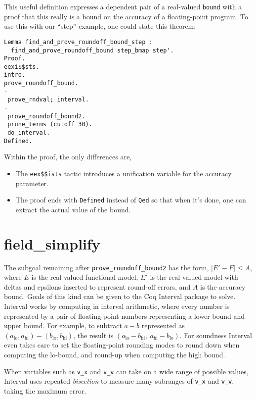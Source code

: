 \documentclass[article]{memoir}
\begin{document}
This useful definition expresses a dependent pair of a real-valued
\lstinline{bound} with a proof that this really is a bound
on the accuracy of a floating-point program.  To use this with
our ``step'' example, one could state this theorem:

\begin{lstlisting}
Lemma find_and_prove_roundoff_bound_step :
  find_and_prove_roundoff_bound step_bmap step'.
Proof.
eexi$$sts.
intro.
prove_roundoff_bound.
-
 prove_rndval; interval.
-
 prove_roundoff_bound2.
 prune_terms (cutoff 30).
 do_interval.
Defined.
\end{lstlisting}

Within the proof, the only differences are,
\begin{itemize}
\item  The \lstinline{eex$$ists} tactic introduces a unification variable
  for the accuracy parameter.
\item The proof ends with \lstinline{Defined} instead of \lstinline{Qed}
  so that when it's done, one can extract the actual value of the bound.
\end{itemize}

\chapter{field\_simplify}

The subgoal remaining after \lstinline{prove_roundoff_bound2} has the
form, $|E'-E|\le A$, where $E$ is the real-valued functional model,
$E'$ is the real-valued model with deltas and epsilons inserted to
represent round-off errors, and $A$ is the accuracy bound.
Goals of this kind can be given to the Coq Interval package to solve.
Interval works by computing in interval arithmetic,
where every number is represented by a pair of floating-point numbers
representing a lower bound and upper bound.  For example, to subtract
$a-b$ represented as $(a_\mathrm{lo},a_\mathrm{hi})-(b_\mathrm{lo},b_\mathrm{hi})$,
the result is $(a_\mathrm{lo}-b_\mathrm{hi},~a_\mathrm{hi}-b_\mathrm{lo})$.
For soundness Interval even takes care to set the floating-point rounding modes
to round down when computing the lo-bound, and round-up when computing
the high bound.

When variables such as \lstinline{v_x} and \lstinline{v_v} can
take on a wide range of possible values, Interval uses
repeated \emph{bisection} to measure many subranges
of \lstinline{v_x} and \lstinline{v_v}, taking the maximum error.
\end{document}
